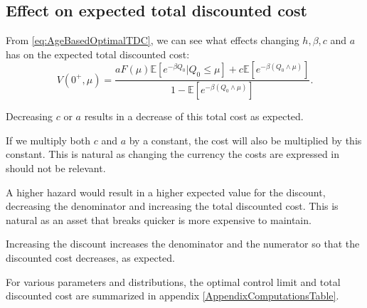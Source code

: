 \subsection{Effect on expected total discounted cost}
From \eqref{eq:AgeBasedOptimalTDC}, we can see what effects changing $h,\beta,c$ and $a$ has on the expected total discounted cost:
\[V(0^+,\mu)=\frac{aF(\mu)\mathbb{E}[e^{-\beta Q_0}|Q_0\leq \mu]+c\mathbb{E}[e^{-\beta(Q_0\wedge\mu)}]}{1-\mathbb{E}[e^{-\beta (Q_0\wedge\mu)}]}.\]
\begin{remark}
	Decreasing $c$ or $a$ results in a decrease of this total cost as expected.
\end{remark}
\begin{remark}\label{remark:AgeBasedCostRatio}
	If we multiply both $c$ and $a$ by a constant, the cost will also be multiplied by this constant.
	This is natural as changing the currency the costs are expressed in should not be relevant.
\end{remark}
\begin{remark}
	A higher hazard would result in a higher expected value for the discount, decreasing the denominator and increasing the total discounted cost.
	This is natural as an asset that breaks quicker is more expensive to maintain.
\end{remark}
\begin{remark}\label{remark:AgeBasedTDCDiscountIncrease}
	Increasing the discount increases the denominator and the numerator so that the discounted cost decreases, as expected.
\end{remark}
For various parameters and distributions, the optimal control limit and total discounted cost are summarized in appendix \ref{AppendixComputationsTable}.